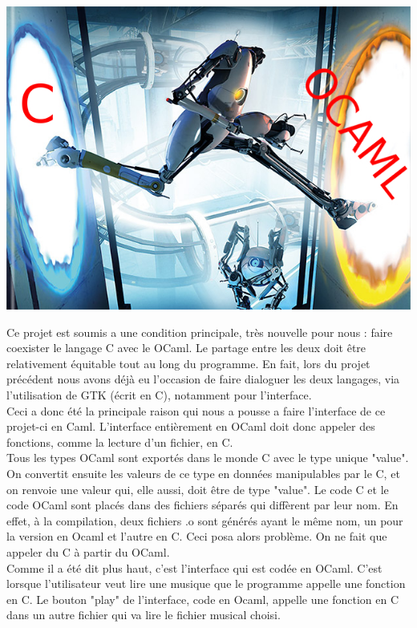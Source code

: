 \documentclass[12pt,a4paper]{report}
\begin{document}
\begin{center}
\includegraphics[scale=0.5]{COcaml.jpg}
\end{center}

Ce projet est soumis a une condition principale, très nouvelle pour nous : faire coexister le langage C avec le OCaml. Le partage entre les deux doit être relativement équitable tout au long du programme. En fait, lors du projet précédent nous avons déjà eu l'occasion de faire dialoguer les deux langages, via l'utilisation de GTK (écrit en C), notamment pour l'interface.\\

Ceci a donc été la principale raison qui nous a pousse a faire l'interface de ce projet-ci en Caml. L'interface entièrement en OCaml doit donc appeler des fonctions, comme la lecture d'un fichier, en C.\\

Tous les types OCaml sont exportés dans le monde C avec le type unique "value". On convertit ensuite les valeurs de ce type en données manipulables par le C, et on renvoie une valeur qui, elle aussi, doit être de type "value". Le code C et le code OCaml sont placés dans des fichiers séparés qui diffèrent par leur nom. En effet, à la compilation, deux fichiers .o sont générés ayant le même nom, un pour la version en Ocaml et l'autre en C. Ceci posa alors problème. On ne fait que appeler du C à partir du OCaml.\\

Comme il a été dit plus haut, c'est l'interface qui est codée en OCaml. C'est lorsque l'utilisateur veut lire une musique que le programme appelle une fonction en C. Le bouton "play" de l'interface, code en Ocaml, appelle une fonction en C dans un autre fichier qui va lire le fichier musical choisi.\\
\end{document}
